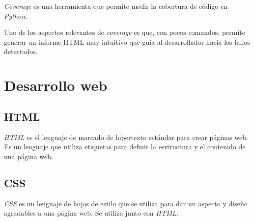 \emph{Coverage} es una herramienta que permite medir la cobertura de código en \emph{Python}. 

Uno de los aspectos relevantes de \emph{coverage} es que, con pocos comandos, permite generar
un informe HTML muy intuitivo que guía al desarrollador hacia los fallos detectados. 





\section{Desarrollo web}\label{desarrollo_web}

\subsection{HTML}\label{html}

\emph{HTML} \citep{wiki:html} es el lenguaje de marcado de hipertexto estándar para crear páginas web. Es un lenguaje que utiliza etiquetas para definir la esrtructura y el contenido de una página web. 

\subsection{CSS}\label{css}

\emph{CSS} \citep{wiki:css} es un lenguaje de hojas de estilo que se utiliza para dar un aspecto y diseño agradables a una página web. Se utiliza junto con \emph{HTML}.

